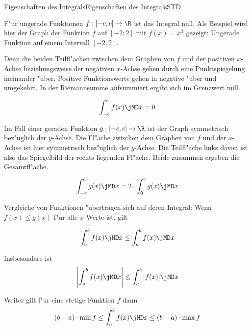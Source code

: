 \begin{MXContent}{Eigenschaften des Integrals}{Eigenschaften des Integrals}{STD}

F"ur ungerade Funktionen $f: [-c, c] \rightarrow \R$ ist das Integral null. 
Als Beispiel wird hier der Graph der Funktion $f$ auf $[-2; 2]$ mit 
$f(x) = x^3$ gezeigt:
%
{Ungerade Funktion auf einem Intervall $[-2, 2]$.}{}

Denn die 
beiden Teilfl"achen zwischen dem Graphen von $f$ und der positiven $x$-Achse 
beziehungsweise der negativen $x$-Achse gehen durch eine Punktspiegelung 
ineinander "uber. Positive Funktionswerte gehen in negative "uber und umgekehrt.
In der Riemannsumme aufsummiert ergibt sich im Grenzwert null.

\begin{equation}
\int_{-c}^c f(x) \jMD x = 0 %
\end{equation}

Im Fall einer geraden Funktion $g: [-c, c] \rightarrow \R$ ist der Graph 
symmetrisch
bez"uglich der $y$-Achse. Die Fl"ache zwischen dem Graphen von $f$ und der 
$x$-Achse ist hier symmetrisch bez"uglich der $y$-Achse. Die Teilfl"ache links 
davon ist also das Spiegelbild der rechts liegenden Fl"ache. Beide zusammen 
ergeben die Gesamtfl"ache.

\begin{equation}
\int_{-c}^c g(x) \jMD x = 2 \cdot \int_{0}^c g(x) \jMD x %
\end{equation}

Vergleiche von Funktionen "ubertragen sich auf deren Integral:
Wenn $f(x) \leq g(x)$ f"ur alle $x$-Werte ist, gilt 

\begin{equation}
\int_a^b f(x) \jMD x \leq \int_a^b f(x) \jMD x %
\end{equation}

Insbesondere ist
\begin{equation}
\left|\int_a^b f(x) \jMD x\right| \leq \int_a^b |f(x)| \jMD x %
\end{equation}

Weiter gilt f"ur eine stetige Funktion $f$ dann
\begin{equation}
(b-a) \cdot \min f \leq \int_a^b f(x) \jMD x \leq (b-a) \cdot \max f %
\end{equation}

\end{MXContent}



